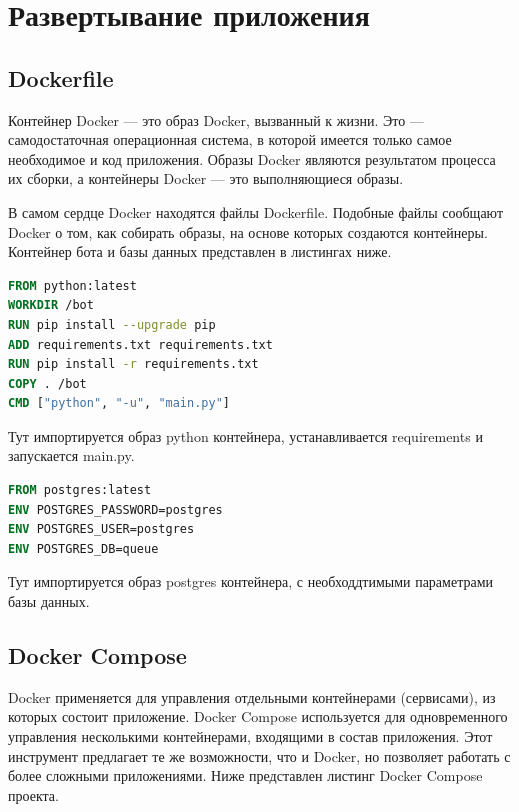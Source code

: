 \graphicspath{{./img/}}

\chapter{Развертывание приложения}
\section{Dockerfile}
Контейнер Docker --- это образ Docker, вызванный к жизни.
Это --- самодостаточная операционная система, в которой имеется только самое
необходимое и код приложения. Образы Docker являются результатом процесса
их сборки, а контейнеры Docker --- это выполняющиеся образы.\par
В самом сердце Docker находятся файлы Dockerfile.
Подобные файлы сообщают Docker о том, как собирать образы, на основе
которых создаются контейнеры. Контейнер бота и базы данных представлен
в листингах ниже.

\begin{lstlisting}[language=Dockerfile
	, caption=\leftline{Dockerfile бота}
	, label=lst:DF:bot
	, columns=flexible
	]
FROM python:latest
WORKDIR /bot
RUN pip install --upgrade pip
ADD requirements.txt requirements.txt
RUN pip install -r requirements.txt
COPY . /bot
CMD ["python", "-u", "main.py"]
\end{lstlisting}

Тут импортируется образ python контейнера, устанавливается requirements
и запускается main.py.

\begin{lstlisting}[language=Dockerfile
	, caption=\leftline{Dockerfile базы данных}
	, label=lst:DF:db
	, columns=flexible
	]
FROM postgres:latest
ENV POSTGRES_PASSWORD=postgres
ENV POSTGRES_USER=postgres
ENV POSTGRES_DB=queue
\end{lstlisting}

Тут импортируется образ postgres контейнера, с необходдтимыми параметрами
базы данных.


\section{Docker Compose}
Docker применяется для управления отдельными контейнерами (сервисами),
из которых состоит приложение. Docker Compose используется для одновременного
управления несколькими контейнерами, входящими в состав приложения.
Этот инструмент предлагает те же возможности, что и Docker,
но позволяет работать с более сложными приложениями.
Ниже представлен листинг Docker Compose проекта.

